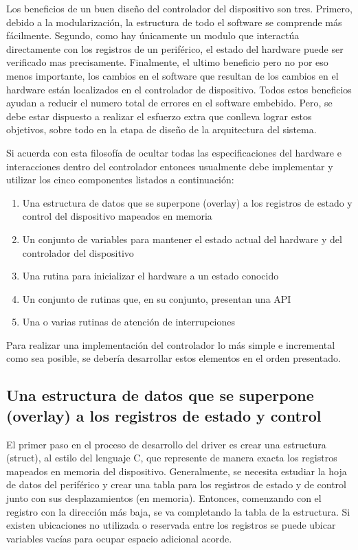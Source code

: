 \documentclass[output=paper, 
colorlinks,
citecolor=brown,
newtxmath
]{langscibook}
\begin{document}
Los beneficios de un buen diseño del controlador del dispositivo son tres.
Primero, debido a la modularización, la estructura de todo el software
se comprende más fácilmente. Segundo, como hay únicamente un modulo 
que interactúa directamente con los registros de un periférico, el estado
del hardware puede ser verificado mas precisamente. Finalmente, el ultimo 
beneficio pero no por eso menos importante, los cambios en el software que
resultan de los cambios en el hardware están localizados en el controlador
de dispositivo. Todos estos beneficios ayudan a reducir el numero total
de errores en el software embebido.
Pero, se debe estar dispuesto a
realizar el esfuerzo extra que conlleva lograr estos objetivos,
sobre todo en la etapa de diseño de la arquitectura del sistema.

Si acuerda con esta filosofía de ocultar todas las especificaciones del hardware
e interacciones dentro del controlador entonces usualmente debe 
implementar y utilizar los cinco componentes listados a continuación:

\begin{enumerate}
\item Una estructura de datos que se superpone (overlay) a los registros de estado
y control del dispositivo mapeados en memoria
\item Un conjunto de variables para mantener el estado actual del hardware
y del controlador del dispositivo
\item Una rutina para inicializar el hardware a un estado conocido
\item Un conjunto de rutinas que, en su conjunto, presentan una API 
\item Una o varias rutinas de atención de interrupciones

\end{enumerate}

Para realizar una implementación del controlador lo más simple e incremental
como sea posible, se debería desarrollar estos elementos en el orden
presentado.

\subsection{Una estructura de datos que se superpone (overlay) a los registros de estado
y control}

El primer paso en el proceso de desarrollo del driver es crear una estructura
(struct), al estilo del lenguaje C, que represente de manera exacta los registros
mapeados en memoria del dispositivo. Generalmente, se necesita estudiar
la hoja de datos del periférico y crear una tabla para los registros
de estado y de control junto con sus desplazamientos (en memoria).
Entonces, comenzando con el registro con la dirección más baja, se 
va completando la tabla de la estructura. Si existen ubicaciones no 
utilizada o reservada entre los registros se puede ubicar variables
vacías para ocupar espacio adicional acorde.
\end{document}
